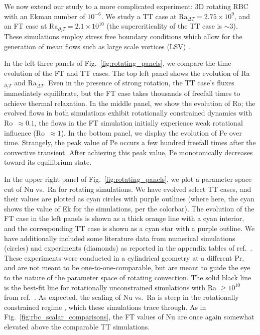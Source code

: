 \documentclass[aps, pre, onecolumn, nofootinbib, notitlepage, groupedaddress, amsfonts, amssymb, amsmath, longbibliography, superscriptaddress]{revtex4-1}
\begin{document}
We now extend our study to a more complicated experiment: 3D rotating RBC with an Ekman number of $10^{-6}$.
We study a TT case at Ra$_{\Delta T} = 2.75\times 10^9$, and an FT case at $\text{Ra}_{\partial_z T} = 2.1 \times 10^{10}$ (the supercriticality of the TT case is $\sim 3$).
These simulations employ stress free boundary conditions which allow for the generation of mean flows such as large scale vortices (LSV) \cite{couston&all2019}.

In the left three panels of Fig.~\ref{fig:rotating_panels}, we compare the time evolution of the FT and TT cases.
The top left panel shows the evolution of Ra$_{\partial_z T}$ and Ra$_{\Delta T}$.
Even in the presence of strong rotation, the TT case's fluxes immediately equilibrate, but the FT case takes thousands of freefall times to achieve thermal relaxation.
In the middle panel, we show the evolution of Ro; the evolved flows in both simulations exhibit rotationally constrained dynamics with Ro $\,\approx 0.1$, the flows in the FT simulation initially experience weak rotational influence (Ro $\,\approx 1$).
In the bottom panel, we display the evolution of Pe over time.
Strangely, the peak value of Pe occurs a few hundred freefall times after the convective transient.
After achieving this peak value, Pe monotonically decreases toward its equilibrium state.

In the upper right panel of Fig.~\ref{fig:rotating_panels}, we plot a parameter space cut of Nu vs.~Ra for rotating simulations.
We have evolved select TT cases, and their values are plotted as cyan circles with purple outlines (where here, the cyan shows the value of Ek for the simulations, per the colorbar).
The evolution of the FT case in the left panels is shown as a thick orange line with a cyan interior, and the corresponding TT case is shown as a cyan star with a purple outline.
We have additionally included some literature data from numerical simulations (circles) and experiments (diamonds) as reported in the appendix tables of ref.~\cite{cheng&all2015}.
These experiments were conducted in a cylindrical geometry at a different Pr, and are not meant to be one-to-one-comparable, but are meant to guide the eye to the nature of the parameter space of rotating convection.
The solid black line is the best-fit line for rotationally unconstrained simulations with Ra $\geq 10^{10}$ from ref.~\cite{cheng&all2015}.
As expected, the scaling of Nu vs.~Ra is steep in the rotationally constrained regime \cite{julien&all2012, plumley&julien2019}, which these simulations trace through.
As in Fig.~\ref{fig:rbc_scalar_comparisons}, the FT values of Nu are once again somewhat elevated above the comparable TT simulations.
\end{document}

